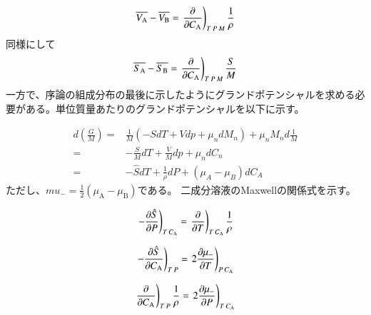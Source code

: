 \documentclass[a4paper,12pt, oneside, openany]{jsbook}
\begin{document}
\begin{equation}\label{V}
  \overline{V_{\mathrm{A}}}-\overline{V_{\mathrm{B}}}=\left.\frac{\partial}{\partial C_\mathrm{A}}\right)_{T\hspace{0.5mm}P\hspace{0.5mm}M}\frac{1}{\rho}
\end{equation}
同様にして
\begin{equation}\label{S}
  \overline{S_{\mathrm{A}}}-\overline{S_{\mathrm{B}}}=\left.\frac{\partial}{\partial C_\mathrm{A}}\right)_{T\hspace{0.5mm}P\hspace{0.5mm}M}\frac{S}{M}
\end{equation}
一方で、序論の組成分布の最後に示したようにグランドポテンシャルを求める必要がある。単位質量あたりのグランドポテンシャルを以下に示す。

\begin{equation}
\begin{split}
  d\left(\frac{G}{M}\right)=&\frac{1}{M}(-SdT+Vdp+\mu_ndM_n)+\mu_nM_nd\frac{1}{M}\\
  =&-\frac{S}{M}dT+\frac{V}{M}dp+\mu_ndC_n\\=&-\widehat{S}dT+\frac{1}{\rho}dP+(\mu_A-\mu_B)dC_A
\end{split}
\end{equation}
ただし、$mu_-=\frac{1}{2}(\mu_\mathrm{A}-\mu_\mathrm{B})$である。
二成分溶液のMaxwellの関係式を示す。

\begin{equation}\label{maxwell1}
 \left.- \frac{\partial \hat{S}}{\partial P}\right)_{T\hspace{0.5mm}C_\mathrm{A}}=\left.\frac{\partial}{\partial T}\right)_{T\hspace{0.5mm}C_\mathrm{A}}\frac{1}{\rho}
\end{equation}

\begin{equation}\label{maxwell2}
 \left.- \frac{\partial \hat{S}}{\partial C_\mathrm{A}}\right)_{T\hspace{0.5mm}P}=\left.2\frac{\partial \mu_-}{\partial T}\right)_{P\hspace{0.5mm}C_\mathrm{A}}
\end{equation}

\begin{equation}\label{maxwell3}
   \left. \frac{\partial }{\partial C_\mathrm{A}}\right)_{T\hspace{0.5mm}P}\frac{1}{\rho}=\left.2\frac{\partial \mu_-}{\partial P}\right)_{T\hspace{0.5mm}C_\mathrm{A}}
\end{equation}
\end{document}
